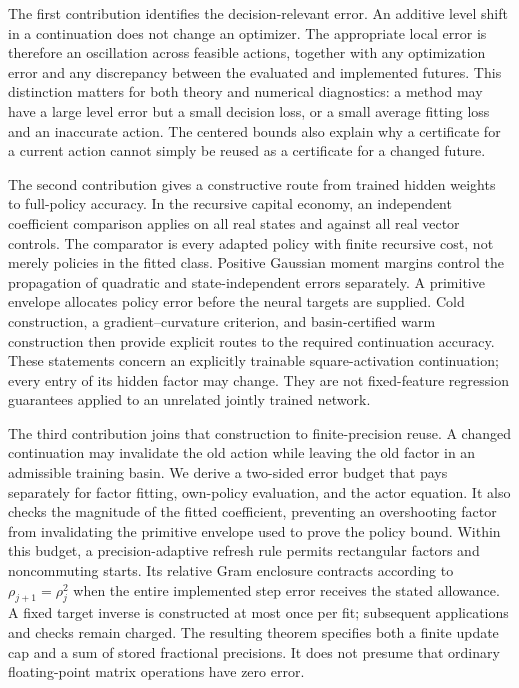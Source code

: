 \documentclass[ecta,nameyear,draft]{econsocart}
\theoremstyle{definition}
\theoremstyle{remark}
\begin{document}
The first contribution identifies the decision-relevant error. An additive
level shift in a continuation does not change an optimizer. The appropriate
local error is therefore an oscillation across feasible actions, together
with any optimization error and any discrepancy between the evaluated and
implemented futures. This distinction matters for both theory and numerical
diagnostics: a method may have a large level error but a small decision loss,
or a small average fitting loss and an inaccurate action. The centered bounds
also explain why a certificate for a current action cannot simply be reused
as a certificate for a changed future.

The second contribution gives a constructive route from trained hidden
weights to full-policy accuracy. In the recursive capital economy, an
independent coefficient comparison applies on all real states and against
all real vector controls. The comparator is every adapted policy with finite
recursive cost, not merely policies in the fitted class. Positive Gaussian
moment margins control the propagation of quadratic and state-independent
errors separately. A primitive envelope allocates policy error before the
neural targets are supplied. Cold construction, a gradient--curvature
criterion, and basin-certified warm construction then provide explicit routes
to the required continuation accuracy. These statements concern an explicitly
trainable square-activation continuation; every entry of its hidden factor
may change. They are not fixed-feature regression guarantees applied to an
unrelated jointly trained network.

The third contribution joins that construction to finite-precision reuse.
A changed continuation may invalidate the old action while leaving the old
factor in an admissible training basin. We derive a two-sided error budget
that pays separately for factor fitting, own-policy evaluation, and the actor
equation. It also checks the magnitude of the fitted coefficient, preventing
an overshooting factor from invalidating the primitive envelope used to prove
the policy bound. Within this budget, a precision-adaptive refresh rule permits
rectangular factors and noncommuting starts. Its relative Gram enclosure
contracts according to $\rho_{j+1}=\rho_j^2$ when the entire implemented
step error receives the stated allowance. A fixed target inverse is constructed
at most once per fit; subsequent applications and checks remain charged.
The resulting theorem specifies both a finite update cap and a sum of stored
fractional precisions. It does not presume that ordinary floating-point
matrix operations have zero error.
\end{document}
